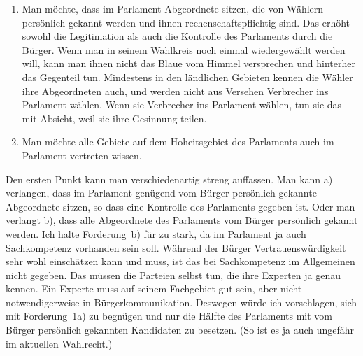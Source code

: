 \begin{enumerate}
  \item Man möchte, dass im Parlament Abgeordnete sitzen, die von Wählern persönlich gekannt
    werden und ihnen rechenschaftspflichtig sind. Das erhöht sowohl die Legitimation als auch die
    Kontrolle des Parlaments durch die Bürger. Wenn man in seinem Wahlkreis noch einmal
    wiedergewählt werden will, kann man ihnen nicht das Blaue vom Himmel versprechen und hinterher
    das Gegenteil tun. Mindestens in den ländlichen Gebieten kennen die Wähler ihre Abgeordneten
    auch, und werden nicht aus Versehen Verbrecher ins Parlament wählen. Wenn sie Verbrecher ins
    Parlament wählen, tun sie das mit Absicht, weil sie ihre Gesinnung teilen.

  \item Man möchte alle Gebiete auf dem Hoheitsgebiet des Parlaments auch im Parlament vertreten
    wissen.
\end{enumerate}

Den ersten Punkt kann man verschiedenartig streng auffassen. Man kann a) verlangen, dass im
Parlament genügend vom Bürger persönlich gekannte Abgeordnete sitzen, so dass eine Kontrolle des
Parlaments gegeben ist. Oder man verlangt b), dass alle Abgeordnete des Parlaments vom Bürger
persönlich gekannt werden. Ich halte Forderung~b) für zu stark, da im Parlament ja auch
Sachkompetenz vorhanden sein soll. Während der Bürger Vertrauenswürdigkeit sehr wohl einschätzen
kann und muss, ist das bei Sachkompetenz im Allgemeinen nicht gegeben. Das müssen die Parteien
selbst tun, die ihre Experten ja genau kennen. Ein Experte muss auf seinem Fachgebiet gut sein,
aber nicht notwendigerweise in Bürgerkommunikation. Deswegen würde ich vorschlagen, sich mit
Forderung~1a) zu begnügen und nur die Hälfte des Parlaments mit vom Bürger persönlich gekannten
Kandidaten zu besetzen. (So ist es ja auch ungefähr im aktuellen Wahlrecht.)

